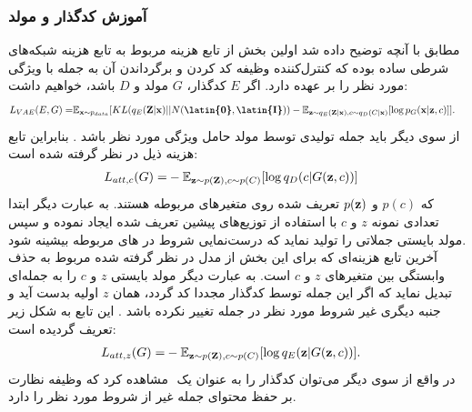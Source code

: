 \subsubsection*{آموزش کدگذار و مولد}
مطابق با آنچه توضیح داده شد اولین بخش از تابع هزینه مربوط به تابع هزینه شبکه‌های \vae{} شرطی ساده بوده که کنترل‌کننده وظیفه کد کردن و برگرداندن آن به جمله با ویژگی مورد نظر را بر عهده دارد. اگر $E$ کدگذار، $G$ مولد و $D$ \discriminator{} باشد، خواهیم داشت:
\begin{equation}
	\begin{split}
		L_{VAE} (E, G) =& \expected_{\bff{x} \sim p_{data}} [KL (q_E(\bff{Z}|\bff{x}) || N(\textbf{\latin{0}},\textbf{\latin{I}})) - \expected_{\bff{z} \sim q_E(\bff{Z}|\bff{x}), c \sim q_D(C|\bff{x})} [\log p_G(\bff{x}|\bff{z},c)]].
	\end{split}
\end{equation}
از سوی دیگر باید جمله تولیدی توسط مولد حامل ویژگی مورد نظر باشد \cite{toward}. بنابراین تابع هزینه ذیل در نظر گرفته شده است:
\begin{equation}
	\begin{split}
		L_{att, c} (G) =& -\mathbb E_{{\bf z} \sim p({\bf Z}), c \sim p(C)} [\log q_D(c|G({\bf z}, c))]
	\end{split}
\end{equation}
که $p(c)$ و $p({\bf z})$
تعریف شده روی متغیرهای مربوطه هستند. به عبارت دیگر ابتدا تعدادی نمونه $z$ و $c$ با استفاده از توزیع‌های پیشین تعریف شده ایجاد نموده و سپس مولد بایستی جملاتی را تولید نماید که درست‌نمایی شروط در \discriminator{}‌های مربوطه بیشینه شود.\\
آخرین تابع هزینه‌ای که برای این بخش از مدل در نظر گرفته شده مربوط به حذف وابستگی بین متغیرهای $z$ و $c$ است. به عبارت دیگر مولد بایستی $z$ و $c$ را به جمله‌ای تبدیل نماید که اگر این جمله توسط کدگذار مجددا کد گردد، همان $z$ اولیه بدست آید و جنبه دیگری غیر شروط مورد نظر در جمله تغییر نکرده باشد \cite{toward}. این تابع به شکل زیر تعریف گردیده است:
\begin{equation}
	\begin{split}
		L_{att, z} (G) =& -\mathbb E_{{\bf z} \sim p({\bf Z}), c \sim p(C)} [\log q_E({\bf z}|G({\bf z}, c))].
	\end{split}
\end{equation}
در واقع از سوی دیگر می‌توان کدگذار را به عنوان یک \discriminator{}‌ مشاهده کرد که وظیفه نظارت بر حفظ محتوای جمله غیر از شروط مورد نظر را دارد.
